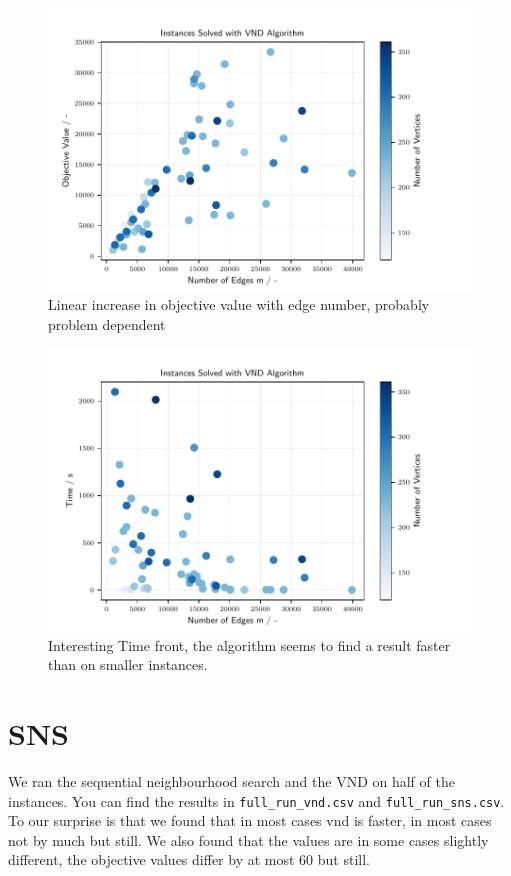\begin{figure}[h]
    \centering
    \includegraphics[width=0.7\linewidth, trim= {0 0cm 0 0cm}, clip]{figures/vnd_edges_vs_objVal.pdf}
    \caption{\label{fig:types}Linear increase in objective value with edge number, probably problem dependent}
\end{figure}

\begin{figure}[h]
    \centering
    \includegraphics[width=0.7\linewidth, trim= {0 0cm 0 0cm}, clip]{figures/vnd_edges_vs_time.pdf}
    \caption{\label{fig:types}Interesting Time front, the algorithm seems to find a result faster than on smaller instances.}
\end{figure}


\section{SNS}
We ran the sequential neighbourhood search and the VND on half of the instances. You can find the results in \texttt{full\_run\_vnd.csv} and \texttt{full\_run\_sns.csv}. To our surprise is that we found that in most cases vnd is faster, in most cases not by much but still. We also found that the values are in some cases slightly different, the objective values differ by at most 60 but still.

